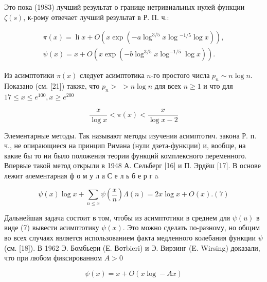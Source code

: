 \documentclass[10pt]{article}
\begin{document}
Это пока (1983) лучший результат о границе нетривиальных нулей функции $\zeta(s)$, к-рому отвечает лучший результат в Р. П. ч.:



\[

\begin{gathered}

\pi(x)=\operatorname{li} x+O\left(x \exp \left(-a \log ^{3 / 5} x \log { }^{-1 / 5} \log x\right)\right), \\

\psi(x)=x+O\left(x \exp \left(-b \log ^{3 / 5} x \log ^{-1 / 5} \log x\right)\right) .

\end{gathered}

\]



Из асимптотики $\pi(x)$ следует асимптотика $n$-го простого числа $p_{n} \sim n \log n$. Показано (см. [21]) также, что $p_{n}>$ $>n \log n$ для всех $n \geqslant 1$ и что для $17 \leqslant x \leqslant e^{100}, x \geqslant e^{200}$



\[

\frac{x}{\log x}<\pi(x)<\frac{x}{\log x-2}

\]



Элементарные методы. Так называют методы изучения асимптотич. закона Р. п. ч., не опирающиеся на принцип Римана (нули дзета-функции) и, вообще, на какие бы то ни было положения теории функций комплексного переменного. Впервые такой метод открыли в 1948 А. Сельберг [16] и П. Эрдёш [17]. В основе лежит әлементарная ф о м у л а С е л ь б е р г a



\[

\psi(x) \log x+\sum_{n \leqslant x} \psi\left(\frac{x}{n}\right) \Lambda(n)=2 x \log x+O(x) .(7)

\]



Дальнейшая задача состоит в том, чтобы из асимптотики в среднем для $\psi(u)$ в виде (7) вывести асимптотику $\psi(x)$. Это можно сделать по-разному, но общим во всех случаях является использованием факта медленного колебания функции $\psi$ (см. [18]). В 1962 Э. Бомбьери (Е. Вотbieri) и Э. Вирзинг (E. Wirsing) доказали, что при любом фиксированном $A>0$



\[

\psi(x)=x+O(x \log -A x)

\]
\end{document}
